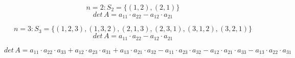\begin{example}
    $$n = 2: S_2=\{(1,2), (2,1)\}$$
    $$det\,A = a_{11} \cdot a_{22} - a_{12} \cdot a_{21}$$
\end{example}

\begin{example}
    $$n = 3: S_3=\{(1,2,3), (1,3,2), (2,1,3), (2,3,1), (3,1,2), (3,2,1)\}$$
    $$det\,A = a_{11} \cdot a_{22} - a_{12} \cdot a_{21}$$

    $$det\,A = a_{11}\cdot a_{22}\cdot a_{33} +
               a_{12}\cdot a_{23}\cdot a_{31} +
               a_{13}\cdot a_{21}\cdot a_{32} -
               a_{11}\cdot a_{23}\cdot a_{32} -
               a_{12}\cdot a_{21}\cdot a_{33} -
               a_{13}\cdot a_{22}\cdot a_{31}
    $$
\end{example}

\begin{definition}

\end{definition}

